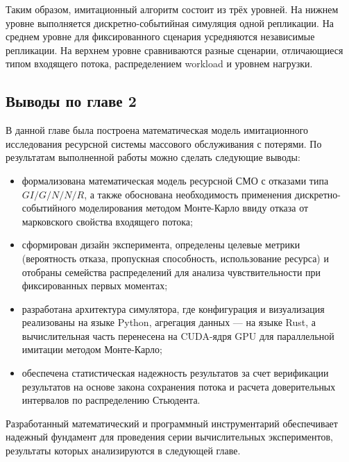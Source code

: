 Таким образом, имитационный алгоритм состоит из трёх уровней. На нижнем уровне выполняется дискретно-событийная симуляция одной репликации. На среднем уровне для фиксированного сценария усредняются независимые репликации. На верхнем уровне сравниваются разные сценарии, отличающиеся типом входящего потока, распределением workload и уровнем нагрузки.

\subsection*{Выводы по главе 2}

В данной главе была построена математическая модель имитационного исследования ресурсной системы массового обслуживания с потерями. По результатам выполненной работы можно сделать следующие выводы:

\begin{itemize}[label=\textemdash, leftmargin=*, itemsep=6pt, parsep=0pt]
    \item формализована математическая модель ресурсной СМО с отказами типа $GI/G/N/N/R$, а также обоснована необходимость применения дискретно-событийного моделирования методом Монте-Карло ввиду отказа от марковского свойства входящего потока;
    \item сформирован дизайн эксперимента, определены целевые метрики (вероятность отказа, пропускная способность, использование ресурса) и отобраны семейства распределений для анализа чувствительности при фиксированных первых моментах;
    \item разработана архитектура симулятора, где конфигурация и визуализация реализованы на языке Python, агрегация данных — на языке Rust, а вычислительная часть перенесена на CUDA-ядря GPU для параллельной имитации методом Монте-Карло;
    \item обеспечена статистическая надежность результатов за счет верификации результатов на основе закона сохранения потока и расчета доверительных интервалов по распределению Стьюдента.
\end{itemize}

\bigskip %
Разработанный математический и программный инструментарий обеспечивает надежный фундамент для проведения серии вычислительных экспериментов, результаты которых анализируются в следующей главе.